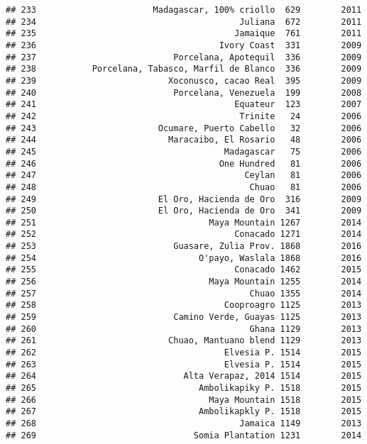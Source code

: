 \documentclass[
]{article}
\begin{document}
\begin{verbatim}
## 233                       Madagascar, 100% criollo  629        2011
## 234                                        Juliana  672        2011
## 235                                       Jamaique  761        2011
## 236                                    Ivory Coast  331        2009
## 237                           Porcelana, Apotequil  336        2009
## 238           Porcelana, Tabasco, Marfil de Blanco  336        2009
## 239                          Xoconusco, cacao Real  395        2009
## 240                           Porcelana, Venezuela  199        2008
## 241                                       Equateur  123        2007
## 242                                        Trinite   24        2006
## 243                        Ocumare, Puerto Cabello   32        2006
## 244                          Maracaibo, El Rosario   48        2006
## 245                                     Madagascar   75        2006
## 246                                    One Hundred   81        2006
## 247                                         Ceylan   81        2006
## 248                                          Chuao   81        2006
## 249                        El Oro, Hacienda de Oro  316        2009
## 250                        El Oro, Hacienda de Oro  341        2009
## 251                                  Maya Mountain 1267        2014
## 252                                       Conacado 1271        2014
## 253                           Guasare, Zulia Prov. 1868        2016
## 254                                O'payo, Waslala 1868        2016
## 255                                       Conacado 1462        2015
## 256                                  Maya Mountain 1255        2014
## 257                                          Chuao 1355        2014
## 258                                     Cooproagro 1125        2013
## 259                           Camino Verde, Guayas 1125        2013
## 260                                          Ghana 1129        2013
## 261                          Chuao, Mantuano blend 1129        2013
## 262                                     Elvesia P. 1514        2015
## 263                                     Elvesia P. 1514        2015
## 264                             Alta Verapaz, 2014 1514        2015
## 265                                Ambolikapiky P. 1518        2015
## 266                                  Maya Mountain 1518        2015
## 267                                Ambolikapkly P. 1518        2015
## 268                                        Jamaica 1149        2013
## 269                               Somia Plantation 1231        2014

\end{verbatim}
\end{document}
